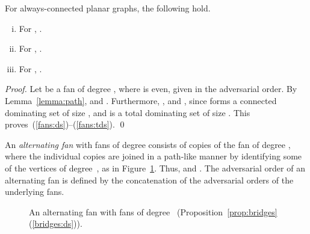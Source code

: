 \begin{proposition}
\label{prop:fans}
For always-connected planar graphs, the following hold.
\begin{enumerate}[(i)]
\item \label{fans:ds} For \ds, .
\item \label{fans:cds} For \cds, .
\item \label{fans:tds} For \tds, .
\end{enumerate}
\end{proposition}
\begin{proof}
Let  be a fan of degree , where  is even, given in the adversarial
order. By Lemma~\ref{lemma:path},
 and .
Furthermore,
, and ,
since  forms a connected dominating set of size , and 
 is a total dominating set of size .
This proves~(\ref{fans:ds})--(\ref{fans:tds}).
\qed\end{proof}

An \emph{alternating fan} with  fans of degree 
consists of  copies of the fan of degree ,
where the individual copies are joined in a path-like manner by
identifying some of the vertices of degree~, as in
Figure~\ref{fig:alt-fan}. 
Thus,  and .
The adversarial 
order of an alternating fan is defined by the concatenation of
the adversarial orders of the underlying fans.

\begin{figure}[!htb]
\begin{center}
\caption{An alternating fan with  fans of degree~ (Proposition~\ref{prop:bridges}(\ref{bridges:ds})).}
\label{fig:alt-fan}
\end{center}
\end{figure}

